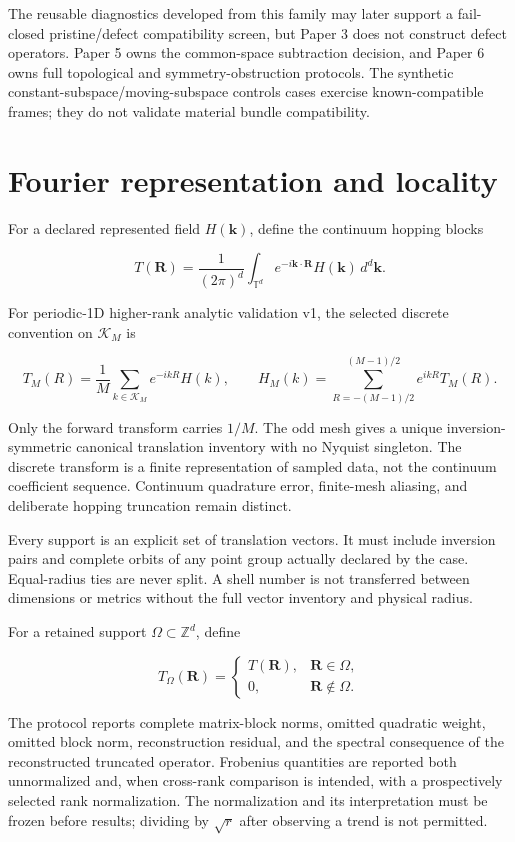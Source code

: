 \documentclass[11pt]{article}
\begin{document}
The reusable diagnostics developed from this family may later support a fail-closed
pristine/defect compatibility screen, but Paper 3 does not construct defect operators.
Paper 5 owns the common-space subtraction decision, and Paper 6 owns full topological
and symmetry-obstruction protocols. The synthetic constant-subspace/moving-subspace controls cases exercise known-compatible
frames; they do not validate material bundle compatibility.

\section{Fourier representation and locality}

For a declared represented field $H(\mathbf k)$, define the continuum hopping blocks

\[
T(\mathbf R)=\frac{1}{(2\pi)^d}
\int_{\mathbb T^d}e^{-i\mathbf k\cdot\mathbf R}
H(\mathbf k)\,d^d\mathbf k.
\]

For periodic-1D higher-rank analytic validation v1, the selected discrete convention on $\mathcal K_M$ is

\[
T_M(R)=\frac1M\sum_{k\in\mathcal K_M}e^{-ikR}H(k),
\qquad
H_M(k)=\sum_{R=-(M-1)/2}^{(M-1)/2}e^{ikR}T_M(R).
\]

Only the forward transform carries $1/M$. The odd mesh gives a unique inversion-symmetric
canonical translation inventory with no Nyquist singleton. The discrete transform is a
finite representation of sampled data, not the continuum coefficient sequence.
Continuum quadrature error, finite-mesh aliasing, and deliberate hopping truncation
remain distinct.

Every support is an explicit set of translation vectors. It must include inversion pairs
and complete orbits of any point group actually declared by the case. Equal-radius ties
are never split. A shell number is not transferred between dimensions or metrics without
the full vector inventory and physical radius.

For a retained support $\Omega\subset\mathbb Z^d$, define

\[
T_\Omega(\mathbf R)=
\begin{cases}
T(\mathbf R),&\mathbf R\in\Omega,\\
0,&\mathbf R\notin\Omega.
\end{cases}
\]

The protocol reports complete matrix-block norms, omitted quadratic weight, omitted block
norm, reconstruction residual, and the spectral consequence of the reconstructed
truncated operator. Frobenius quantities are reported both unnormalized and, when
cross-rank comparison is intended, with a prospectively selected rank normalization.
The normalization and its interpretation must be frozen before results; dividing by
$\sqrt r$ after observing a trend is not permitted.
\end{document}
